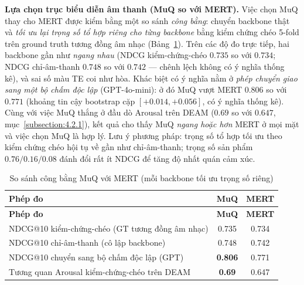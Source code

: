 \documentclass[../DoAn.tex]{subfiles}
\begin{document}
\textbf{Lựa chọn trục biểu diễn âm thanh (MuQ so với MERT).} Việc chọn MuQ thay cho MERT được kiểm bằng một so sánh \textit{công bằng}: chuyển backbone thật và \textit{tối ưu lại trọng số tổ hợp riêng cho từng backbone} bằng kiểm chứng chéo 5-fold trên ground truth tương đồng âm nhạc (Bảng~\ref{table:backbone}). Trên các độ đo trực tiếp, hai backbone gần như \textit{ngang nhau} (NDCG kiểm-chứng-chéo $0.735$ so với $0.734$; NDCG chỉ-âm-thanh $0.748$ so với $0.742$ --- chênh lệch không có ý nghĩa thống kê), và sai số màu TE coi như hòa. Khác biệt có ý nghĩa nằm ở \textit{phép chuyển giao sang một bộ chấm độc lập} (GPT-4o-mini): ở đó MuQ vượt MERT $0.806$ so với $0.771$ (khoảng tin cậy bootstrap cặp $[+0.014, +0.056]$, có ý nghĩa thống kê). Cùng với việc MuQ thắng ở đầu dò Arousal trên DEAM ($0.69$ so với $0.647$, mục~\ref{subsection:4.2.1}), kết quả cho thấy MuQ \textit{ngang hoặc hơn} MERT ở mọi mặt và việc chọn MuQ là hợp lý. Lưu ý phương pháp: trọng số tổ hợp tối ưu theo kiểm chứng chéo hội tụ về gần như chỉ-âm-thanh; trọng số sản phẩm $0.76/0.16/0.08$ đánh đổi rất ít NDCG để tăng độ nhất quán cảm xúc.

\begin{longtable}{|p{7.6cm}|c|c|}
\caption{So sánh công bằng MuQ với MERT (mỗi backbone tối ưu trọng số riêng)}\label{table:backbone}\\
\hline
\textbf{Phép đo} & \textbf{MuQ} & \textbf{MERT} \\
\hline
\endfirsthead
\hline
\textbf{Phép đo} & \textbf{MuQ} & \textbf{MERT} \\
\hline
\endhead
NDCG@10 kiểm-chứng-chéo (GT tương đồng âm nhạc) & 0.735 & 0.734 \\
\hline
NDCG@10 chỉ-âm-thanh (cô lập backbone) & 0.748 & 0.742 \\
\hline
NDCG@10 chuyển sang bộ chấm độc lập (GPT) & \textbf{0.806} & 0.771 \\
\hline
Tương quan Arousal kiểm-chứng-chéo trên DEAM & \textbf{0.69} & 0.647 \\
\hline
\end{longtable}
\end{document}

